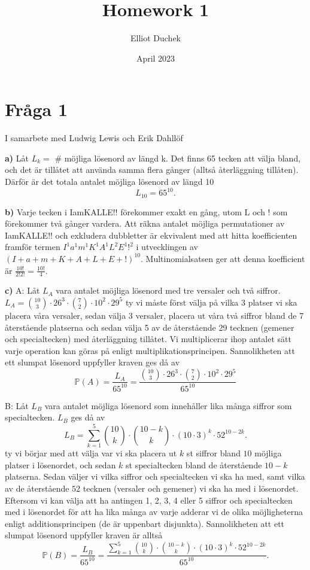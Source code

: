 \documentclass{article}
\title{Homework 1}
\author{Elliot Duchek}
\date{April 2023}
\begin{document}
\maketitle

\section{Fråga 1}
I samarbete med Ludwig Lewis och Erik Dahllöf

\textbf{a)}
Låt $L_k=$ \# möjliga lösenord av längd k. Det finns 65 tecken att välja bland, och det är tillåtet att använda samma flera gånger (alltså återläggning tillåten). Därför är det totala antalet möjliga lösenord av längd 10
\[
	L_{10}=65^{10}
.\] 

\textbf{b)}
Varje tecken i IamKALLE!! förekommer exakt en gång, utom L och ! som förekommer två gånger vardera. Att räkna antalet möjliga permutationer av IamKALLE!! och exkludera dubbletter är ekvivalent med att hitta koefficienten framför termen $I^1a^1m^1K^1A^1L^2E^1!^2$ i utvecklingen av $(I+a+m+K+A+L+E+!)^{10}$. Multinomialsatsen ger att denna koefficient är $\frac{10!}{2!2!} = \frac{10!}{4}$.

\textbf{c)}
A: Låt $L_A$ vara antalet möjliga lösenord med tre versaler och två siffror. $L_A = {10 \choose 3} \cdot 26^{3} \cdot {7 \choose 2} \cdot 10^{2} \cdot 29^{5}$ ty vi måste först välja på vilka 3 platser vi ska placera våra versaler, sedan välja 3 versaler, placera ut våra två siffror bland de 7 återstående platserna och sedan välja 5 av de återstående 29 tecknen (gemener och specialtecken) med återläggning tillåtet. Vi multiplicerar ihop antalet sätt varje operation kan göras på enligt multiplikationsprincipen. Sannolikheten att ett slumpat lösenord uppfyller kraven ges då av
\[
	\mathbb{P}(A) = \frac{L_A}{65^{10}} = \frac{{10 \choose 3} \cdot 26^{3} \cdot {7 \choose 2} \cdot 10^{2} \cdot 29^{5}}{65^{10}}
\] 

B: Låt $L_B$ vara antalet möjliga lösenord som innehåller lika många siffror som specialtecken. $L_B$ ges då av
 \[
	 L_B = \sum\limits_{k=1}^{5} {10 \choose k} \cdot {10-k \choose k} \cdot \left( 10 \cdot 3 \right)^{k} \cdot 52^{10-2k} 
.\] 
ty vi börjar med att välja var vi ska placera ut $k$ st siffror bland $10$ möjliga platser i lösenordet, och sedan $k$ st specialtecken bland de återstående $10-k$ platserna. Sedan väljer vi vilka siffror och specialtecken vi ska ha med, samt vilka av de återstående $52$ tecknen (versaler och gemener) vi ska ha med i lösenordet. Eftersom vi kan välja att ha antingen 1, 2, 3, 4 eller 5 siffror och specialtecken med i lösenordet för att ha lika många av varje adderar vi de olika möjligheterna enligt additionsprincipen (de är uppenbart disjunkta). Sannolikheten att ett slumpat lösenord uppfyller kraven är alltså
\[
	\mathbb{P}(B) = \frac{L_B}{65^{10}} = \frac{\sum\limits_{k=1}^{5} {10 \choose k} \cdot {10-k \choose k} \cdot \left( 10 \cdot 3 \right)^{k} \cdot 52^{10-2k}}{65^{10}}
.\] 
\end{document}
